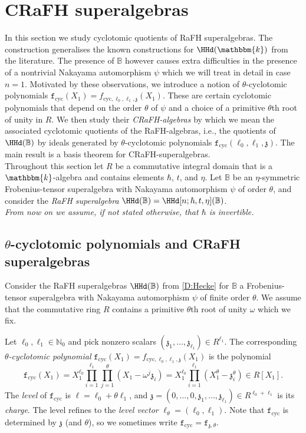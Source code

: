 \documentclass[a4paper,11pt]{amsart}
\numberwithin{equation}{subsection}
\theoremstyle{definition}
\theoremstyle{theorem}
\theoremstyle{remark}
\newcommand\charge{{\mathfrak{z}}}
\newcommand\kapp{{\mathfrak{z}}}
\newcommand\fcyc{\mathtt{f}_{\text{cyc}}}
\newcommand\N{\mathbb{N}}
\newcommand\kk{\mathbbm{k}}
\newcommand\RR{R}
\newcommand{\Bo}{\mathbb{B}}
\begin{document}
 \section{CRaFH superalgebras}\label{S:CycRH}
  In this section we study cyclotomic quotients of RaFH superalgebras. The construction generalises the known constructions for $\HHd(\kk)$ from the literature. The presence of $\Bo$ however causes extra difficulties in the presence of a nontrivial Nakayama automorphism $\psi$ which we will treat in detail in case $n=1$.
 Motivated by these observations, we introduce a notion of
 $\theta$-cyclotomic polynomials
 $\fcyc(X_1)=f_{\text{cyc},\ell_0,\ell_1,\charge}(X_1)$. These
 are certain cyclotomic polynomials that depend on the order $\theta$ of $\psi$  and a choice of a primitive $\theta$th root of unity in $\RR$.  We then study their \emph{CRaFH-algebras} by which we mean the associated cyclotomic quotients of the RaFH-algebras, i.e.,  the quotients of $\HHd(\Bo)$ by ideals generated by $\theta$-cyclotomic polynomials $\fcyc(\ell_0,\ell_1,\charge)$. The main result is a basis theorem for CRaFH-superalgebras.\\


Throughout this section let $\RR$ be a commutative integral domain that
is a $\kk$-algebra and contains elements $\hbar$, $t$, and $\eta$.  Let $\Bo$ be an $\eta$-symmetric Frobenius-tensor superalgebra with Nakayama automorphism $\psi$ of order $\theta$, and consider the  \emph{RaFH superalgebra} $\HHd(\Bo)=\HHd[n;\hbar, t, \eta](\Bo)$.\\
 \emph{From now on we assume, if not stated otherwise, that $\hbar$ is invertible.}

  \subsection{$\theta$-cyclotomic polynomials and CRaFH superalgebras}
 Consider the RaFH superalgebras $\HHd(\Bo)$ from  \autoref{D:Hecke} for $\Bo$ a Frobenius-tensor superalgebra with Nakayama automorphism $\psi$ of finite order $\theta$.  We assume that the commutative ring $\RR$ contains a primitive $\theta$th root of unity $\omega$ which we fix.

 \begin{Definition}\label{D:fcyc}
   Let $\ell_0,\ell_1\in\N_0$ and pick nonzero scalars $(\kapp_1,\ldots,
   \kapp_{\ell_1})\in \RR^{\ell_1}$. The corresponding
   \emph{$\theta$-cyclotomic polynomial}
   $\fcyc(X_1)=f_{\text{cyc},\ell_0,\ell_1,\charge}(X_1)$  is the polynomial
   \begin{equation}\label{cyclotomicpoly} \fcyc(X_1)=X_1^{\ell_0}\prod_{i=1}^{\ell_1} \prod_{j=1}^\theta(X_1-\omega^j\kapp_i)= X_1^{\ell_0}
         \prod_{i=1}^{\ell_1}(X_1^\theta-\kapp_i^\theta)\in\RR[X_1].
    \end{equation}
   The \emph{level} of $\fcyc $ is $\ell=\ell_0+\theta\ell_1$, and
   $\charge=(0,\ldots, 0,\kapp_1,\ldots,\kapp_{\ell_1})\in
   R^{\ell_0+\ell_1}$ is its \emph{charge}. The level refines to the
   \emph{level vector} $\ell_\theta=(\ell_0,\ell_1)$.  Note that $\fcyc$
   is determined by $\charge$ (and $\theta$), so we sometimes write $\fcyc=\mathtt{f}_{\charge,\theta}$.
    \end{Definition}
\end{document}
